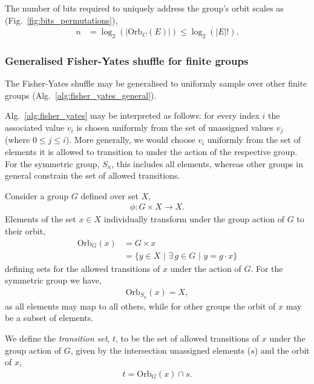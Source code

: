The number of bits required to uniquely address the group's orbit scales as (Fig.~\ref{fig:bits_permutations}),
\begin{align}
	n & = \log_2(|\mathrm{Orb}_C(E)|) \leq \log_2(|E|!).
\end{align}

\subsubsection{Generalised Fisher-Yates shuffle for finite groups}

The Fisher-Yates shuffle may be generalised to uniformly sample over other finite groups (Alg.~\ref{alg:fisher_yates_general}).

Alg.~\ref{alg:fisher_yates} may be interpreted as follows: for every index $i$ the associated value $v_i$ is chosen uniformly from the set of unassigned values $v_j$ (where $0\leq j\leq i$). More generally, we would choose $v_i$ uniformly from the set of elements it is allowed to transition to under the action of the respective group. For the symmetric group, $S_n$, this includes all elements, whereas other groups in general constrain the set of allowed transitions.

Consider a group $G$ defined over set $X$,
\begin{align}
	\phi: G\times X \to X.
\end{align}
Elements of the set $x\in X$ individually transform under the group action of $G$ to their orbit,
\begin{align}
	\mathrm{Orb}_G(x) & = G\times x \nonumber                                         \\
	                  & = \{ y\in X \,\,|\,\, \exists \,g\in G \,\,|\,\, y=g\cdot x\}
\end{align}
defining sets for the allowed transitions of $x$ under the action of $G$. For the symmetric group we have,
\begin{align}
	\mathrm{Orb}_{S_n}(x) = X,
\end{align}
as all elements may map to all others, while for other groups the orbit of $x$ may be a subset of elements.

We define the \emph{transition set}, $t$, to be the set of allowed transitions of $x$ under the group action of $G$, given by the intersection unassigned elements ($s$) and the orbit of $x$,
\begin{align}
	t = \mathrm{Orb}_G(x) \cap s.
\end{align}

